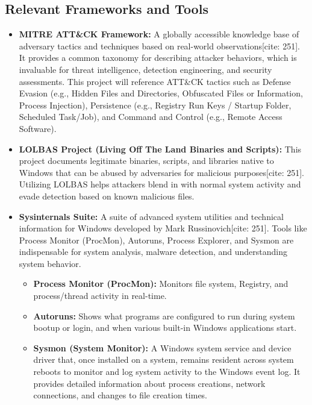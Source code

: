 \documentclass[11pt]{article}
\begin{document}
	\subsection{Relevant Frameworks and Tools}
	\begin{itemize}
		\item \textbf{MITRE ATT\&CK Framework:} A globally accessible knowledge base of adversary tactics and techniques based on real-world observations[cite: 251]. It provides a common taxonomy for describing attacker behaviors, which is invaluable for threat intelligence, detection engineering, and security assessments. This project will reference ATT\&CK tactics such as Defense Evasion (e.g., Hidden Files and Directories, Obfuscated Files or Information, Process Injection), Persistence (e.g., Registry Run Keys / Startup Folder, Scheduled Task/Job), and Command and Control (e.g., Remote Access Software).
		\item \textbf{LOLBAS Project (Living Off The Land Binaries and Scripts):} This project documents legitimate binaries, scripts, and libraries native to Windows that can be abused by adversaries for malicious purposes[cite: 251]. Utilizing LOLBAS helps attackers blend in with normal system activity and evade detection based on known malicious files.
		\item \textbf{Sysinternals Suite:} A suite of advanced system utilities and technical information for Windows developed by Mark Russinovich[cite: 251]. Tools like Process Monitor (ProcMon), Autoruns, Process Explorer, and Sysmon are indispensable for system analysis, malware detection, and understanding system behavior.
		\begin{itemize}
			\item \textbf{Process Monitor (ProcMon):} Monitors file system, Registry, and process/thread activity in real-time.
			\item \textbf{Autoruns:} Shows what programs are configured to run during system bootup or login, and when various built-in Windows applications start.
			\item \textbf{Sysmon (System Monitor):} A Windows system service and device driver that, once installed on a system, remains resident across system reboots to monitor and log system activity to the Windows event log. It provides detailed information about process creations, network connections, and changes to file creation times.
		\end{itemize}
	\end{itemize}
\end{document}
